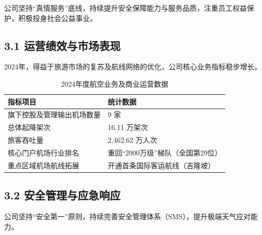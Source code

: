 \documentclass[a4paper,12pt]{article}
\begin{document}
公司坚持“真情服务”底线，持续提升安全保障能力与服务品质，注重员工权益保护，积极投身社会公益事业。

\subsection{3.1 运营绩效与市场表现}

2024年，得益于旅游市场的复苏及航线网络的优化，公司核心业务指标稳步增长。

\begin{table}[H]
    \centering
    \caption{2024年度航空业务及商业运营数据}
    \label{tab:ops_stats}
    \renewcommand{\arraystretch}{1.2}
    \begin{tabular}{p{8cm} p{5cm}}
        \toprule
        \textbf{指标项目} & \textbf{统计数据} \\
        \midrule
        旗下控股及管理输出机场数量 & 9 家 \\
        总体起降架次 & 16.11 万架次 \\
        旅客吞吐量 & 2,462.62 万人次 \\
        核心门户机场行业排名 & 重回“2000万级”梯队（全国第29位） \\
        重点区域机场航线拓展 & 开通首条国际客运航线（吉隆坡） \\
        \bottomrule
    \end{tabular}
\end{table}

\subsection{3.2 安全管理与应急响应}

公司坚持“安全第一”原则，持续完善安全管理体系（SMS），提升极端天气应对能力。
\end{document}
